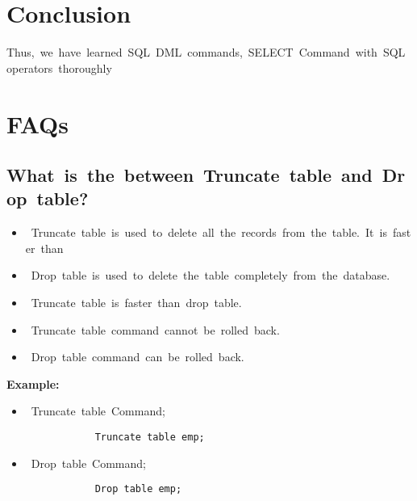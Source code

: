 \documentclass{article}
\begin{document}
	\section{\textbf{Conclusion}} 
	Thus, we have learned SQL DML commands, SELECT Command with SQL operators thoroughly 
	
	\section{\textbf{FAQs}} 
	\subsection{\textbf{What is the between Truncate table and Drop table?}} 
	\begin{itemize} 
		\item Truncate table is used to delete all the records from the table. It is faster than 
		\item Drop table is used to delete the table completely from the database. 
		\item Truncate table is faster than drop table. 
		\item Truncate table command cannot be rolled back. 
		\item Drop table command can be rolled back. 
	\end{itemize} 
	\textbf{Example:} 
	\begin{itemize} 
		\item Truncate table Command; 
		\begin{verbatim} 
			Truncate table emp; 
		\end{verbatim} 
		\item Drop table Command; 
		\begin{verbatim} 
			Drop table emp; 
		\end{verbatim} 
	\end{itemize} 
	
\end{document}
